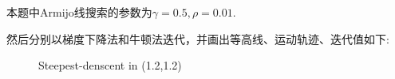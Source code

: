 本题中Armijo线搜索的参数为$\gamma=0.5,\rho=0.01$.

然后分别以梯度下降法和牛顿法迭代，并画出等高线、运动轨迹、迭代值如下:

\begin{figure}[H]
\centering
{}
\caption{Steepest-denscent in (1.2,1.2)}
\label{Fig.lable}
\end{figure}

